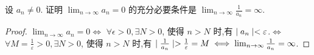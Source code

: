 \begin{practice}
    设 $a_n\ne 0$. 证明 $\lim_{n\to\infty} a_n=0$ 的充分必要条件是 $\lim_{n\to\infty}\frac{1}{a_n}=\infty$.
\end{practice}

\begin{proof}
    $\lim_{n\to\infty} a_n=0\iff$ $\forall \epsilon>0,\exists N>0$, 使得 $n>N$ 时,有 $\mid a_n \mid<\varepsilon$.$\iff $ $\forall M=\frac{1}{\varepsilon}>0,\exists N>0$, 使得 $n>N$ 时,有 $\mid \frac{1}{a_n} \mid>\frac{1}{\varepsilon}=M\iff \lim_{n\to\infty}\frac{1}{a_n}=\infty$.
\end{proof}

\newsection

